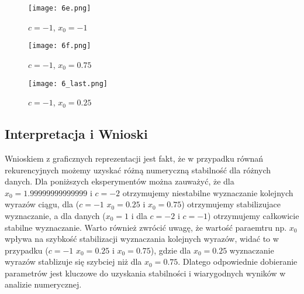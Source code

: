 \documentclass{article}
\begin{document}
\begin{figure}[H] 
\centering
\texttt{[image: 6e.png]}
\caption{$c = -1$, $x_0 = -1$}
\end{figure}

\begin{figure}[H] 
\centering
\texttt{[image: 6f.png]}
\caption{$c = -1$, $x_0 = 0.75$}
\end{figure}

\begin{figure}[H] 
\centering
\texttt{[image: 6\_last.png]}
\caption{$c = -1$, $x_0 = 0.25$}
\end{figure}

\subsection{Interpretacja i Wnioski}
Wnioskiem z graficznych reprezentacji jest fakt, że w przypadku równań rekurencyjnych możemy uzyskać różną numeryczną stabilność dla różnych danych. Dla poniższych eksperymentów można zauważyć, że dla $x_0 = 1.99999999999999$ i $c = -2$ otrzymujemy niestabilne wyznaczanie kolejnych wyrazów ciągu, dla ($c=-1$ $x_0=0.25$ i $x_0=0.75$) otrzymujemy stabilizujace wyznaczanie, a dla danych ($x_0=1$ i dla $c=-2$ i $c=-1$) otrzymujemy całkowicie stabilne wyznaczanie. Warto również zwrócić uwagę, że wartość paraemtru np. $x_0$ wpływa na szybkość stabilizacji wyznaczania kolejnych wyrazów, widać to w przypadku ($c=-1$ $x_0=0.25$ i $x_0=0.75$), gdzie dla $x_0=0.25$ wyznaczanie wyrazów stablizuje się szybciej niż dla $x_0=0.75$. Dlatego odpowiednie dobieranie parametrów jest kluczowe do uzyskania stabilności i wiarygodnych wyników w analizie numerycznej.
\end{document}
